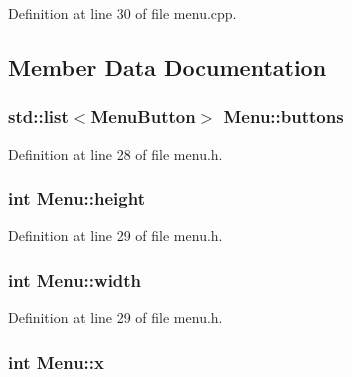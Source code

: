 Definition at line 30 of file menu.\-cpp.



\subsection{Member Data Documentation}
\hypertarget{class_menu_a631c3c73e1f05159ddc2e967b7b4bca7}{
\subsubsection[{buttons}]{\setlength{\rightskip}{0pt plus 5cm}std\-::list$<${\bf Menu\-Button}$>$ Menu\-::buttons\hspace{0.3cm}{\ttfamily [private]}}}\label{class_menu_a631c3c73e1f05159ddc2e967b7b4bca7}


Definition at line 28 of file menu.\-h.

\hypertarget{class_menu_abfd154ce7b19dca62d1ce8483c6f7bba}{
\subsubsection[{height}]{\setlength{\rightskip}{0pt plus 5cm}int Menu\-::height\hspace{0.3cm}{\ttfamily [private]}}}\label{class_menu_abfd154ce7b19dca62d1ce8483c6f7bba}


Definition at line 29 of file menu.\-h.

\hypertarget{class_menu_a30ec519ffccb75388150c64175c4959b}{
\subsubsection[{width}]{\setlength{\rightskip}{0pt plus 5cm}int Menu\-::width\hspace{0.3cm}{\ttfamily [private]}}}\label{class_menu_a30ec519ffccb75388150c64175c4959b}


Definition at line 29 of file menu.\-h.

\hypertarget{class_menu_a26c11055ab1fe19a4862689d4ff85dc7}{
\subsubsection[{x}]{\setlength{\rightskip}{0pt plus 5cm}int Menu\-::x\hspace{0.3cm}{\ttfamily [private]}}}\label{class_menu_a26c11055ab1fe19a4862689d4ff85dc7}


